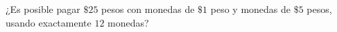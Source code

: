 ¿Es posible pagar $\$25$ pesos con monedas de $\$1$ peso y monedas de $\$5$ pesos, usando exactamente $12$ monedas?